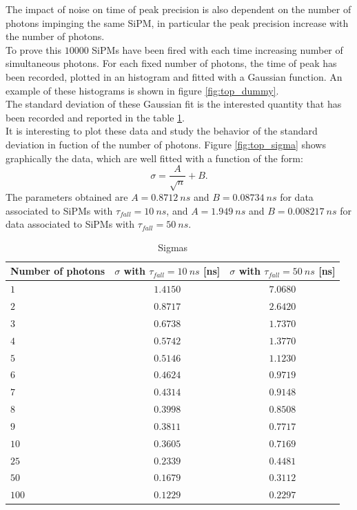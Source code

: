 The impact of noise on time of peak precision is also dependent on the number of photons impinging the same SiPM, in particular the peak precision increase with the number of photons.\\
To prove this $10000$ SiPMs have been fired with each time increasing number of simultaneous photons. For each fixed number of photons, the time of peak has been recorded, plotted in an histogram and fitted with a Gaussian function. An example of these histograms is shown in figure \ref{fig:top_dummy}.\\

The standard deviation of these Gaussian fit is the interested quantity that has been recorded and reported in the table \ref{tab:sigmas}.\\
It is interesting to plot these data and study the behavior of the standard deviation in fuction of the number of photons. Figure \ref{fig:top_sigma} shows graphically the data, which are well fitted with a function of the form:
\begin{equation}
	\sigma = \frac{A}{\sqrt{n}} + B.
\end{equation}
The parameters obtained are $A = 0.8712\ ns$ and $B = 0.08734\ ns$ for data associated to SiPMs with $\tau_{fall}=10\ ns$, and $A = 1.949\ ns$ and $B = 0.008217\ ns$ for data associated to SiPMs with $\tau_{fall}=50\ ns$.

\begin{table}
	\centering
	\begin{tabular}{lcc}
		\toprule
		Number of photons	& $\sigma$ with $\tau_{fall}=10\ ns$ [ns] & $\sigma$ with $\tau_{fall}=50\ ns$ [ns]	\\
		\midrule
		$1$ 	& $1.4150$ & $7.0680$ \\
		$2$ 	& $0.8717$ & $2.6420$ \\
		$3$ 	& $0.6738$ & $1.7370$ \\
		$4$ 	& $0.5742$ & $1.3770$ \\
		$5$ 	& $0.5146$ & $1.1230$ \\
		$6$ 	& $0.4624$ & $0.9719$ \\
		$7$ 	& $0.4314$ & $0.9148$ \\
		$8$ 	& $0.3998$ & $0.8508$ \\
		$9$ 	& $0.3811$ & $0.7717$ \\
		$10$ 	& $0.3605$ & $0.7169$ \\
		$25$ 	& $0.2339$ & $0.4481$ \\
		$50$ 	& $0.1679$ & $0.3112$ \\
		$100$ 	& $0.1229$ & $0.2297$ \\
		\bottomrule
	\end{tabular}
	\caption{Sigmas}
	\label{tab:sigmas}
\end{table}

